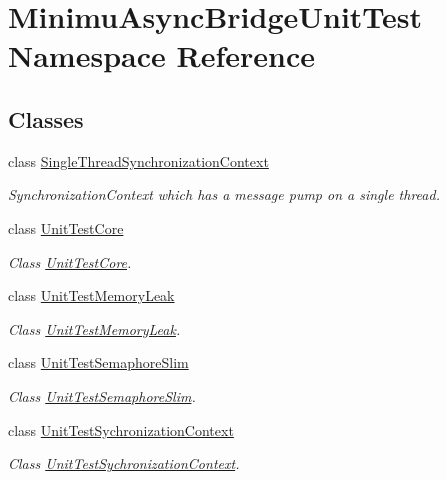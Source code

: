 \hypertarget{namespace_minimu_async_bridge_unit_test}{}\section{Minimu\+Async\+Bridge\+Unit\+Test Namespace Reference}
\label{namespace_minimu_async_bridge_unit_test}
\subsection*{Classes}
\begin{DoxyCompactItemize}
\item 
class \hyperlink{class_minimu_async_bridge_unit_test_1_1_single_thread_synchronization_context}{Single\+Thread\+Synchronization\+Context}
\begin{DoxyCompactList}\small\item\em Synchronization\+Context which has a message pump on a single thread. \end{DoxyCompactList}\item 
class \hyperlink{class_minimu_async_bridge_unit_test_1_1_unit_test_core}{Unit\+Test\+Core}
\begin{DoxyCompactList}\small\item\em Class \hyperlink{class_minimu_async_bridge_unit_test_1_1_unit_test_core}{Unit\+Test\+Core}. \end{DoxyCompactList}\item 
class \hyperlink{class_minimu_async_bridge_unit_test_1_1_unit_test_memory_leak}{Unit\+Test\+Memory\+Leak}
\begin{DoxyCompactList}\small\item\em Class \hyperlink{class_minimu_async_bridge_unit_test_1_1_unit_test_memory_leak}{Unit\+Test\+Memory\+Leak}. \end{DoxyCompactList}\item 
class \hyperlink{class_minimu_async_bridge_unit_test_1_1_unit_test_semaphore_slim}{Unit\+Test\+Semaphore\+Slim}
\begin{DoxyCompactList}\small\item\em Class \hyperlink{class_minimu_async_bridge_unit_test_1_1_unit_test_semaphore_slim}{Unit\+Test\+Semaphore\+Slim}. \end{DoxyCompactList}\item 
class \hyperlink{class_minimu_async_bridge_unit_test_1_1_unit_test_sychronization_context}{Unit\+Test\+Sychronization\+Context}
\begin{DoxyCompactList}\small\item\em Class \hyperlink{class_minimu_async_bridge_unit_test_1_1_unit_test_sychronization_context}{Unit\+Test\+Sychronization\+Context}. \end{DoxyCompactList}\item 

\end{DoxyCompactItemize}
